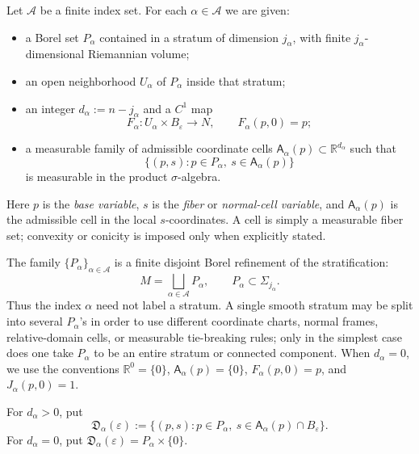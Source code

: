 \documentclass[11pt]{amsart}
\numberwithin{equation}{section}
\theoremstyle{definition}
\theoremstyle{remark}
\newcommand{\R}{\mathbb{R}}
\newcommand{\eps}{\varepsilon}
\newcommand{\cA}{\mathcal{A}}
\newcommand{\fD}{\mathfrak{D}}
\newcommand{\Afib}{\mathsf{A}}
\begin{document}
Let $\cA$ be a finite index set.  For each $\alpha\in\cA$ we are given:
\begin{itemize}[leftmargin=2.2em]
\item a Borel set $P_\alpha$ contained in a stratum of dimension $j_\alpha$,
  with finite $j_\alpha$-dimensional Riemannian volume;
\item an open neighborhood $U_\alpha$ of $P_\alpha$ inside that stratum;
\item an integer $d_\alpha:=n-j_\alpha$ and a $C^1$ map
  \begin{equation}\label{eq:F-alpha}
    F_\alpha:U_\alpha\times B_\eps\longrightarrow N,
    \qquad F_\alpha(p,0)=p;
  \end{equation}
\item a measurable family of admissible coordinate cells
  $\Afib_\alpha(p)\subset\R^{d_\alpha}$ such that
  \begin{equation}\label{eq:measurable-cell-graph}
    \{(p,s):p\in P_\alpha,\ s\in\Afib_\alpha(p)\}
  \end{equation}
  is measurable in the product $\sigma$-algebra.
\end{itemize}
Here $p$ is the \emph{base variable}, $s$ is the \emph{fiber} or
\emph{normal-cell variable}, and $\Afib_\alpha(p)$ is the admissible cell in
the local $s$-coordinates.  A cell is simply a measurable fiber set;
convexity or conicity is imposed only when explicitly stated.

The family $\{P_\alpha\}_{\alpha\in\cA}$ is a finite disjoint Borel
refinement of the stratification:
\[
  M=\bigsqcup_{\alpha\in\cA}P_\alpha,
  \qquad P_\alpha\subset \Sigma_{j_\alpha}.
\]
Thus the index $\alpha$ need not label a stratum.  A single smooth stratum may
be split into several $P_\alpha$'s in order to use different coordinate charts,
normal frames, relative-domain cells, or measurable tie-breaking rules; only in
the simplest case does one take $P_\alpha$ to be an entire stratum or connected
component.  When $d_\alpha=0$, we use the conventions $\R^0=\{0\}$,
$\Afib_\alpha(p)=\{0\}$, $F_\alpha(p,0)=p$, and
$J_\alpha(p,0)=1$.

For $d_\alpha>0$, put
\begin{equation}\label{eq:D-alpha}
  \fD_\alpha(\eps):=
  \{(p,s):p\in P_\alpha,\ s\in\Afib_\alpha(p)\cap B_\eps\}.
\end{equation}
For $d_\alpha=0$, put $\fD_\alpha(\eps)=P_\alpha\times\{0\}$.
\end{document}
